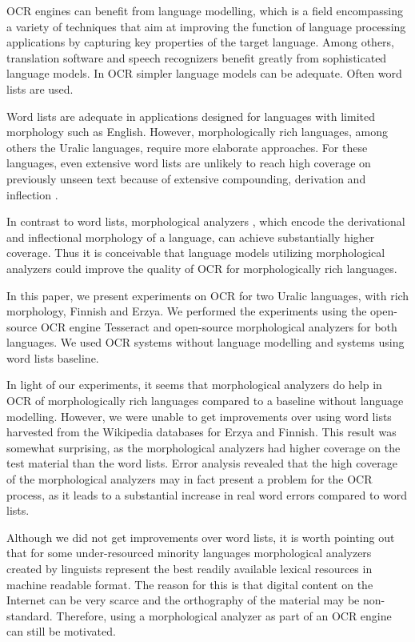 \documentclass[b5paper]{article}
\begin{document}
OCR engines can benefit from language modelling, which is a field
encompassing a variety of techniques that aim at improving the
function of language processing applications by capturing key
properties of the target language. Among others, translation software
and speech recognizers benefit greatly from sophisticated language
models. In OCR simpler language models can be adequate. Often word
lists are used.

Word lists are adequate in applications designed for languages with
limited morphology such as English. However, morphologically rich
languages, among others the Uralic languages, require more elaborate
approaches. For these languages, even extensive word lists are
unlikely to reach high coverage on previously unseen text because
of extensive compounding, derivation and inflection \cite{creutz07}.

In contrast to word lists, morphological analyzers
\cite{koskenniemi83}, which encode the derivational and inflectional
morphology of a language, can achieve substantially higher
coverage. Thus it is conceivable that language models utilizing
morphological analyzers could improve the quality of OCR for
morphologically rich languages.

In this paper, we present experiments on OCR for two Uralic languages,
with rich morphology, Finnish and Erzya. We performed the experiments
using the open-source OCR engine Tesseract \cite{smith07} and
open-source morphological analyzers for both languages. We used OCR
systems without language modelling and systems using word lists
baseline.

In light of our experiments, it seems that morphological analyzers do
help in OCR of morphologically rich languages compared to a baseline
without language modelling. However, we were unable to get improvements
over using word lists harvested from the Wikipedia databases for Erzya
and Finnish. This result was somewhat surprising, as the morphological
analyzers had higher coverage on the test material than the word
lists. Error analysis revealed that the high coverage of the
morphological analyzers may in fact present a problem for the OCR
process, as it leads to a substantial increase in real word errors
compared to word lists.

Although we did not get improvements over word lists, it is worth
pointing out that for some under-resourced minority languages
morphological analyzers created by linguists represent the best
readily available lexical resources in machine readable format. The
reason for this is that digital content on the Internet can be very
scarce and the orthography of the material may be
non-standard. Therefore, using a morphological analyzer as part of an
OCR engine can still be motivated.
\end{document}
